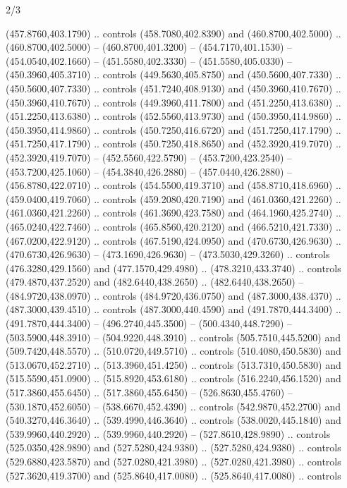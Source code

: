 \begin{flagdescription}{2/3}
\begin{scope}[xshift=0.5\flaglength,yshift=0.5\flagwidth,scale=\flagwidth/638.38]
\begin{scope}[y=0.80pt, x=0.80pt, yscale=-1,shift={(-600,-400)}]
\begin{scope}[shift={(-0.02,2.173)}]
  (457.8760,403.1790) .. controls (458.7080,402.8390) and (460.8700,402.5000) ..
  (460.8700,402.5000) -- (460.8700,401.3200) -- (454.7170,401.1530) --
  (454.0540,402.1660) -- (451.5580,402.3330) -- (451.5580,405.0330) --
  (450.3960,405.3710) .. controls (449.5630,405.8750) and (450.5600,407.7330) ..
  (450.5600,407.7330) .. controls (451.7240,408.9130) and (450.3960,410.7670) ..
  (450.3960,410.7670) .. controls (449.3960,411.7800) and (451.2250,413.6380) ..
  (451.2250,413.6380) .. controls (452.5560,413.9730) and (450.3950,414.9860) ..
  (450.3950,414.9860) .. controls (450.7250,416.6720) and (451.7250,417.1790) ..
  (451.7250,417.1790) .. controls (450.7250,418.8650) and (452.3920,419.7070) ..
  (452.3920,419.7070) -- (452.5560,422.5790) -- (453.7200,423.2540) --
  (453.7200,425.1060) -- (454.3840,426.2880) -- (457.0440,426.2880) --
  (456.8780,422.0710) .. controls (454.5500,419.3710) and (458.8710,418.6960) ..
  (459.0400,419.7060) .. controls (459.2080,420.7190) and (461.0360,421.2260) ..
  (461.0360,421.2260) .. controls (461.3690,423.7580) and (464.1960,425.2740) ..
  (465.0240,422.7460) .. controls (465.8560,420.2120) and (466.5210,421.7330) ..
  (467.0200,422.9120) .. controls (467.5190,424.0950) and (470.6730,426.9630) ..
  (470.6730,426.9630) -- (473.1690,426.9630) -- (473.5030,429.3260) .. controls
  (476.3280,429.1560) and (477.1570,429.4980) .. (478.3210,433.3740) .. controls
  (479.4870,437.2520) and (482.6440,438.2650) .. (482.6440,438.2650) --
  (484.9720,438.0970) .. controls (484.9720,436.0750) and (487.3000,438.4370) ..
  (487.3000,439.4510) .. controls (487.3000,440.4590) and (491.7870,444.3400) ..
  (491.7870,444.3400) -- (496.2740,445.3500) -- (500.4340,448.7290) --
  (503.5900,448.3910) -- (504.9220,448.3910) .. controls (505.7510,445.5200) and
  (509.7420,448.5570) .. (510.0720,449.5710) .. controls (510.4080,450.5830) and
  (513.0670,452.2710) .. (513.3960,451.4250) .. controls (513.7310,450.5830) and
  (515.5590,451.0900) .. (515.8920,453.6180) .. controls (516.2240,456.1520) and
  (517.3860,455.6450) .. (517.3860,455.6450) -- (526.8630,455.4760) --
  (530.1870,452.6050) -- (538.6670,452.4390) .. controls (542.9870,452.2700) and
  (540.3270,446.3640) .. (539.4990,446.3640) .. controls (538.0020,445.1840) and
  (539.9960,440.2920) .. (539.9960,440.2920) -- (527.8610,428.9890) .. controls
  (525.0350,428.9890) and (527.5280,424.9380) .. (527.5280,424.9380) .. controls
  (529.6880,423.5870) and (527.0280,421.3980) .. (527.0280,421.3980) .. controls
  (527.3620,419.3700) and (525.8640,417.0080) .. (525.8640,417.0080) .. controls

\end{scope}
\end{scope}
\end{scope}
\end{flagdescription}
